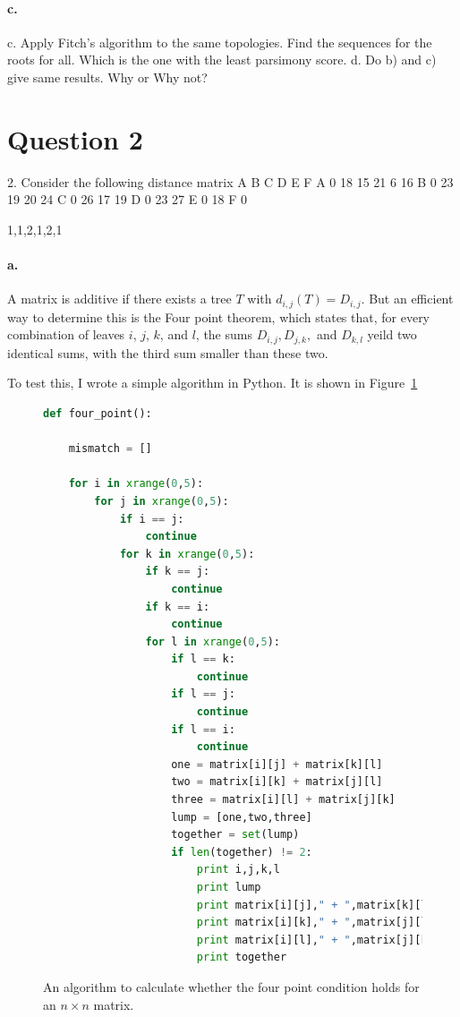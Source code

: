 \documentclass[12pt]{article}
\begin{document}
\paragraph{c.} %
\label{par:1c}


c. Apply Fitch’s algorithm to the same topologies. Find the sequences 
for the roots for all. Which is the one with the least parsimony 
score. 
d. Do b) and c) give same results. Why or Why not?


\section*{Question 2}
2. Consider the following distance matrix
  A  B  C  D  E  F
A 0 18 15 21  6 16
B    0 23 19 20 24
C       0 26 17 19
D          0 23 27
E             0 18
F                0



1,1,2,1,2,1
\paragraph{a.} %

A matrix is additive if there exists a tree $T$ with $d_{i,j}(T) = D_{i,j}$.  But an efficient way to determine this is the Four point theorem, which states that, for every combination of leaves $i$, $j$, $k$, and $l$, the sums $D_{i,j}, D_{j,k},$ and $ D_{k,l}$ yeild two identical sums, with the third sum smaller than these two.

To test this, I wrote a simple algorithm in Python.  It is shown in Figure~\ref{fourpoint}

\begin{figure}[htb]
	\centering
	\begin{lstlisting}[language=Python]
def four_point():

	mismatch = []

	for i in xrange(0,5):
		for j in xrange(0,5):
			if i == j:
				continue
			for k in xrange(0,5):
				if k == j:
					continue
				if k == i:
					continue
				for l in xrange(0,5):
					if l == k:
						continue
					if l == j:
						continue
					if l == i:
						continue
					one = matrix[i][j] + matrix[k][l]
					two = matrix[i][k] + matrix[j][l]
					three = matrix[i][l] + matrix[j][k]
					lump = [one,two,three]
					together = set(lump)
					if len(together) != 2:
						print i,j,k,l
						print lump
						print matrix[i][j]," + ",matrix[k][l]," = ",one
						print matrix[i][k]," + ",matrix[j][l]," = ",two
						print matrix[i][l]," + ",matrix[j][k]," = ",three
						print together
	\end{lstlisting}
	\caption{An algorithm to calculate whether the four point condition holds for an $n\times n$ matrix.}
	\label{fourpoint}
\end{figure}
\end{document}
